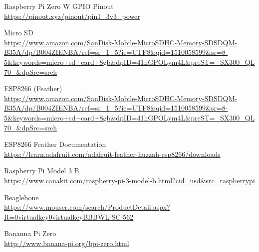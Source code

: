 \documentclass[12pt]{article}
\begin{document}
Raspberry Pi Zero W GPIO Pinout\\
\url{https://pinout.xyz/pinout/pin1\_3v3\_power}

Micro SD\\
\url{https://www.amazon.com/SanDisk-Mobile-MicroSDHC-Memory-SDSDQM-B35A/dp/B004ZIENBA/ref=sr\_1\_5?ie=UTF8\&qid=1510058599\&sr=8-5\&keywords=micro+sd+card+8gb\&dpID=41hGPOLym4L\&preST=\_SX300\_QL70\_\&dpSrc=srch}


ESP8266 (Feather)\\
\url{https://www.amazon.com/SanDisk-Mobile-MicroSDHC-Memory-SDSDQM-B35A/dp/B004ZIENBA/ref=sr\_1\_5?ie=UTF8\&qid=1510058599\&sr=8-5\&keywords=micro+sd+card+8gb\&dpID=41hGPOLym4L\&preST=\_SX300\_QL70\_\&dpSrc=srch}


ESP8266 Feather Documentation\\
\url{https://learn.adafruit.com/adafruit-feather-huzzah-esp8266/downloads}


Raspberry Pi Model 3 B\\
\url{https://www.canakit.com/raspberry-pi-3-model-b.html?cid=usd\&src=raspberrypi}


Beaglebone\\
\url{https://www.mouser.com/search/ProductDetail.aspx?R=0virtualkey0virtualkeyBBBWL-SC-562}


Bananna Pi Zero\\
\url{http://www.banana-pi.org/bpi-zero.html}
\end{document}
